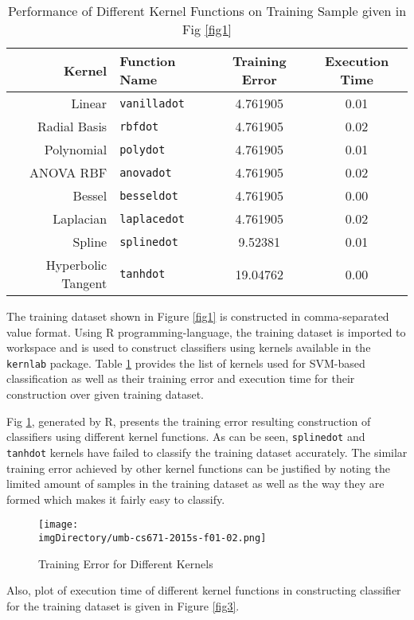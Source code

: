 \begin{table}[H]\centering
\begin{tabular}{r l c c}
Kernel & Function Name & Training Error & Execution Time\\
\hline
Linear & \texttt{vanilladot} & 4.761905 & 0.01\\
Radial Basis & \texttt{rbfdot} & 4.761905 & 0.02\\
Polynomial & \texttt{polydot} & 4.761905 & 0.01\\
ANOVA RBF & \texttt{anovadot} & 4.761905 & 0.02\\
Bessel & \texttt{besseldot} & 4.761905 & 0.00\\
Laplacian & \texttt{laplacedot} & 4.761905 & 0.02\\
Spline & \texttt{splinedot} & 9.52381 & 0.01\\
Hyperbolic Tangent & \texttt{tanhdot} & 19.04762 & 0.00\\
\hline
\end{tabular}
\caption{Performance of Different Kernel Functions on Training Sample given in Fig \ref{fig1}}\label{tab1}
\end{table}

The training dataset shown in Figure \ref{fig1} is constructed in comma-separated value format.
Using R programming-language, the training dataset is imported to workspace and is used to construct classifiers using kernels available in the \texttt{kernlab} package.
Table \ref{tab1} provides the list of kernels used for SVM-based classification as well as their training error and execution time for their construction over given training dataset.

Fig \ref{fig2}, generated by R, presents the training error resulting construction of  classifiers using different kernel functions.
As can be seen, \texttt{splinedot} and \texttt{tanhdot} kernels have failed to classify the training dataset accurately.
The similar training error achieved by other kernel functions can be justified by noting the limited amount of samples in the training dataset as well as the way they are formed  which makes it fairly easy to classify.

\begin{figure}\centering
\texttt{[image: \\imgDirectory/umb-cs671-2015s-f01-02.png]}
\caption{Training Error for Different Kernels}\label{fig2}
\end{figure}

Also, plot of execution time of different kernel functions in constructing classifier for the training dataset is given in Figure \ref{fig3}.

